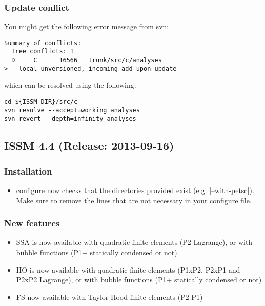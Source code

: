 \subsubsection{Update conflict}
You might get the following error message from svn:
\begin{lstlisting}
Summary of conflicts:
  Tree conflicts: 1
  D     C      16566   trunk/src/c/analyses
>   local unversioned, incoming add upon update
\end{lstlisting}
which can be resolved using the following:
\begin{lstlisting}
cd ${ISSM_DIR}/src/c
svn resolve --accept=working analyses
svn revert --depth=infinity analyses
\end{lstlisting}

\subsection*{ISSM 4.4 (Release: 2013-09-16)}
\subsubsection{Installation}
\begin{itemize}
\item configure now checks that the directories provided exist (e.g. \lstinlinebg|--with-petsc|). Make sure to remove the lines that are not necessary in your configure file.
\end{itemize}
\subsubsection{New features}
\begin{itemize}
\item SSA is now available with quadratic finite elements (P2 Lagrange), or with bubble functions (P1+ statically condensed or not)
\item HO is now available with quadratic finite elements (P1xP2, P2xP1 and P2xP2 Lagrange), or with bubble functions (P1+ statically condensed or not)
\item FS now available with Taylor-Hood finite elements (P2-P1)
\end{itemize}
